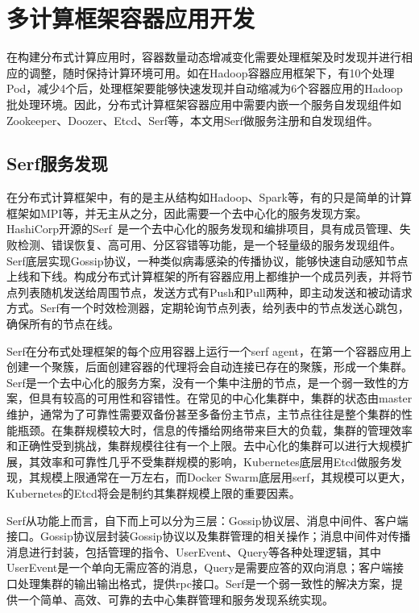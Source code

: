 \section{多计算框架容器应用开发}
在构建分布式计算应用时，容器数量动态增减变化需要处理框架及时发现并进行相应的调整，随时保持计算环境可用。如在Hadoop容器应用框架下，有10个处理Pod，减少4个后，处理框架要能够快速发现并自动缩减为6个容器应用的Hadoop批处理环境。因此，分布式计算框架容器应用中需要内嵌一个服务自发现组件如Zookeeper、Doozer、Etcd、Serf等，本文用Serf做服务注册和自发现组件。

\subsection{Serf服务发现}
在分布式计算框架中，有的是主从结构如Hadoop、Spark等，有的只是简单的计算框架如MPI等，并无主从之分，因此需要一个去中心化的服务发现方案。HashiCorp开源的Serf~\cite{Stubbs2015Distributed}是一个去中心化的服务发现和编排项目，具有成员管理、失败检测、错误恢复、高可用、分区容错等功能，是一个轻量级的服务发现组件。Serf底层实现Gossip协议，一种类似病毒感染的传播协议，能够快速自动感知节点上线和下线。构成分布式计算框架的所有容器应用上都维护一个成员列表，并将节点列表随机发送给周围节点，发送方式有Push和Pull两种，即主动发送和被动请求方式。Serf有一个时效检测器，定期轮询节点列表，给列表中的节点发送心跳包，确保所有的节点在线。

Serf在分布式处理框架的每个应用容器上运行一个serf agent，在第一个容器应用上创建一个聚簇，后面创建容器的代理将会自动连接已存在的聚簇，形成一个集群。Serf是一个去中心化的服务方案，没有一个集中注册的节点，是一个弱一致性的方案，但具有较高的可用性和容错性。在常见的中心化集群中，集群的状态由master维护，通常为了可靠性需要双备份甚至多备份主节点，主节点往往是整个集群的性能瓶颈。在集群规模较大时，信息的传播给网络带来巨大的负载，集群的管理效率和正确性受到挑战，集群规模往往有一个上限。去中心化的集群可以进行大规模扩展，其效率和可靠性几乎不受集群规模的影响，Kubernetes底层用Etcd做服务发现，其规模上限通常在一万左右，而Docker Swarm底层用serf，其规模可以更大，Kubernetes的Etcd将会是制约其集群规模上限的重要因素。

Serf从功能上而言，自下而上可以分为三层：Gossip协议层、消息中间件、客户端接口。Gossip协议层封装Gossip协议以及集群管理的相关操作；消息中间件对传播消息进行封装，包括管理的指令、UserEvent、Query等各种处理逻辑，其中UserEvent是一个单向无需应答的消息，Query是需要应答的双向消息；客户端接口处理集群的输出输出格式，提供rpc接口。Serf是一个弱一致性的解决方案，提供一个简单、高效、可靠的去中心集群管理和服务发现系统实现。

